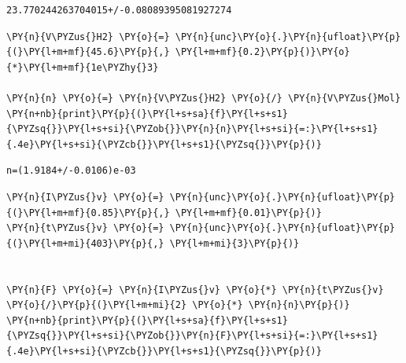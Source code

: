             \begin{tcolorbox}[breakable, size=fbox, boxrule=.5pt, pad at break*=1mm, opacityfill=0]
\begin{Verbatim}[commandchars=\\\{\}]
23.770244263704015+/-0.08089395081927274
\end{Verbatim}
\end{tcolorbox}
        
    \begin{tcolorbox}[breakable, size=fbox, boxrule=1pt, pad at break*=1mm,colback=cellbackground, colframe=cellborder]
\begin{Verbatim}[commandchars=\\\{\}]
\PY{n}{V\PYZus{}H2} \PY{o}{=} \PY{n}{unc}\PY{o}{.}\PY{n}{ufloat}\PY{p}{(}\PY{l+m+mf}{45.6}\PY{p}{,} \PY{l+m+mf}{0.2}\PY{p}{)}\PY{o}{*}\PY{l+m+mf}{1e\PYZhy{}3}  

\PY{n}{n} \PY{o}{=} \PY{n}{V\PYZus{}H2} \PY{o}{/} \PY{n}{V\PYZus{}Mol}
\PY{n+nb}{print}\PY{p}{(}\PY{l+s+sa}{f}\PY{l+s+s1}{\PYZsq{}}\PY{l+s+si}{\PYZob{}}\PY{n}{n}\PY{l+s+si}{=:}\PY{l+s+s1}{.4e}\PY{l+s+si}{\PYZcb{}}\PY{l+s+s1}{\PYZsq{}}\PY{p}{)}
\end{Verbatim}
\end{tcolorbox}

    \begin{Verbatim}[commandchars=\\\{\}]
n=(1.9184+/-0.0106)e-03
    \end{Verbatim}

    \begin{tcolorbox}[breakable, size=fbox, boxrule=1pt, pad at break*=1mm,colback=cellbackground, colframe=cellborder]
\begin{Verbatim}[commandchars=\\\{\}]
\PY{n}{I\PYZus{}v} \PY{o}{=} \PY{n}{unc}\PY{o}{.}\PY{n}{ufloat}\PY{p}{(}\PY{l+m+mf}{0.85}\PY{p}{,} \PY{l+m+mf}{0.01}\PY{p}{)}  
\PY{n}{t\PYZus{}v} \PY{o}{=} \PY{n}{unc}\PY{o}{.}\PY{n}{ufloat}\PY{p}{(}\PY{l+m+mi}{403}\PY{p}{,} \PY{l+m+mi}{3}\PY{p}{)}


\PY{n}{F} \PY{o}{=} \PY{n}{I\PYZus{}v} \PY{o}{*} \PY{n}{t\PYZus{}v} \PY{o}{/}\PY{p}{(}\PY{l+m+mi}{2} \PY{o}{*} \PY{n}{n}\PY{p}{)}
\PY{n+nb}{print}\PY{p}{(}\PY{l+s+sa}{f}\PY{l+s+s1}{\PYZsq{}}\PY{l+s+si}{\PYZob{}}\PY{n}{F}\PY{l+s+si}{=:}\PY{l+s+s1}{.4e}\PY{l+s+si}{\PYZcb{}}\PY{l+s+s1}{\PYZsq{}}\PY{p}{)}
\end{Verbatim}
\end{tcolorbox}

